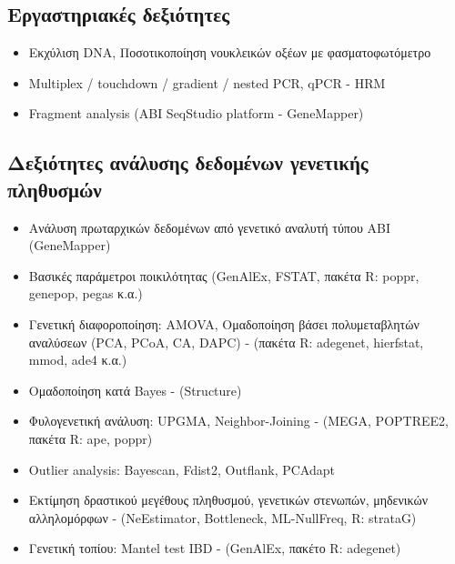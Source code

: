 \documentclass[12pt,]{scrartcl}
\begin{document}

\subsection{Εργαστηριακές δεξιότητες}\label{lab}
\begin{itemize}
\vspace{-3mm}
\setlength\itemsep{-0.6em}
\item Εκχύλιση DNA, Ποσοτικοποίηση νουκλεικών οξέων με φασματοφωτόμετρο
\item Multiplex / touchdown / gradient / nested PCR, qPCR - HRM
\item Fragment analysis (ABI SeqStudio platform - GeneMapper)
\end{itemize}


\subsection{Δεξιότητες ανάλυσης δεδομένων γενετικής πληθυσμών}\label{genetics}
\begin{itemize}
\vspace{-3mm}
\setlength\itemsep{-0.6em}
\item Ανάλυση πρωταρχικών δεδομένων από γενετικό αναλυτή τύπου ΑΒΙ (GeneMapper)
\item Βασικές παράμετροι ποικιλότητας (GenAlEx, FSTAT, πακέτα R: poppr, genepop, pegas κ.α.)
\item Γενετική διαφοροποίηση: AMOVA, Ομαδοποίηση βάσει πολυμεταβλητών αναλύσεων (PCA, PCoA, CA, DAPC) - (πακέτα R: adegenet, hierfstat, mmod, ade4 κ.α.)
\item Ομαδοποίηση κατά Bayes - (Structure)
\item Φυλογενετική ανάλυση: UPGMA, Neighbor-Joining - (MEGA, POPTREE2, πακέτα R: ape, poppr)
\item Outlier analysis: Bayescan, Fdist2, Outflank, PCAdapt
\item Εκτίμηση δραστικού μεγέθους πληθυσμού, γενετικών στενωπών, μηδενικών αλληλομόρφων - (NeEstimator, Bottleneck, ML-NullFreq, R: strataG)
\item Γενετική τοπίου: Mantel test IBD - (GenAlEx, πακέτο R: adegenet)

\end{itemize}
\end{document}
